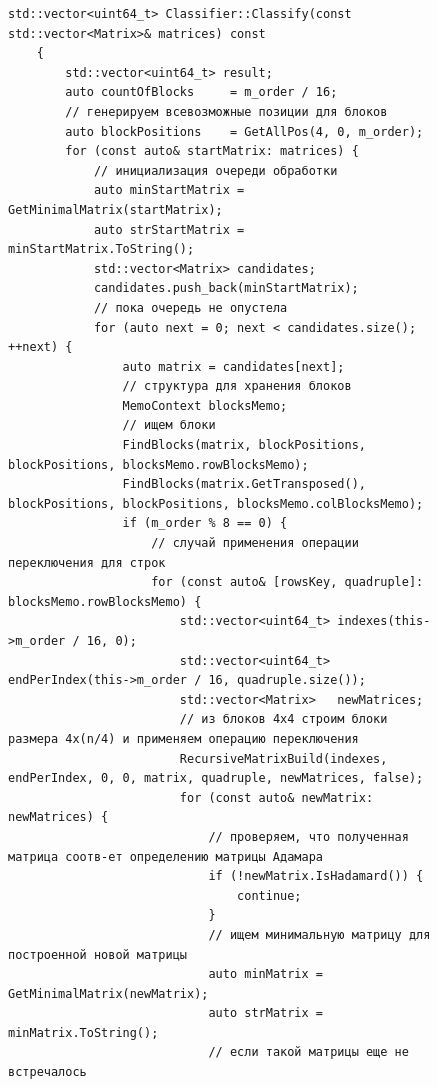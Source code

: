 \documentclass[a4paper, 14pt]{extreport}
\begin{document}
\begin{figure}[H]
    \centering
    \begin{minipage}{\linewidth}
    \begin{lstlisting}[language=С++, tabsize=2, showspaces=false, basicstyle=\fontsize{8}{9}\selectfont, numbers=none]
    std::vector<uint64_t> Classifier::Classify(const std::vector<Matrix>& matrices) const
    {
        std::vector<uint64_t> result;
        auto countOfBlocks     = m_order / 16;
        // генерируем всевозможные позиции для блоков
        auto blockPositions    = GetAllPos(4, 0, m_order);
        for (const auto& startMatrix: matrices) {
            // инициализация очереди обработки
            auto minStartMatrix = GetMinimalMatrix(startMatrix);
            auto strStartMatrix = minStartMatrix.ToString();
            std::vector<Matrix> candidates;
            candidates.push_back(minStartMatrix);
            // пока очередь не опустела
            for (auto next = 0; next < candidates.size(); ++next) {
                auto matrix = candidates[next];
                // структура для хранения блоков
                MemoContext blocksMemo;
                // ищем блоки
                FindBlocks(matrix, blockPositions, blockPositions, blocksMemo.rowBlocksMemo);
                FindBlocks(matrix.GetTransposed(), blockPositions, blockPositions, blocksMemo.colBlocksMemo);
                if (m_order % 8 == 0) {
                    // случай применения операции переключения для строк
                    for (const auto& [rowsKey, quadruple]: blocksMemo.rowBlocksMemo) {
                        std::vector<uint64_t> indexes(this->m_order / 16, 0);
                        std::vector<uint64_t> endPerIndex(this->m_order / 16, quadruple.size());
                        std::vector<Matrix>   newMatrices;
                        // из блоков 4x4 строим блоки размера 4x(n/4) и применяем операцию переключения
                        RecursiveMatrixBuild(indexes, endPerIndex, 0, 0, matrix, quadruple, newMatrices, false);
                        for (const auto& newMatrix: newMatrices) {
                            // проверяем, что полученная матрица соотв-ет определению матрицы Адамара
                            if (!newMatrix.IsHadamard()) {
                                continue;
                            }
                            // ищем минимальную матрицу для построенной новой матрицы
                            auto minMatrix = GetMinimalMatrix(newMatrix);
                            auto strMatrix = minMatrix.ToString();
                            // если такой матрицы еще не встречалось

\end{lstlisting}
\end{minipage}
\end{figure}
\end{document}
